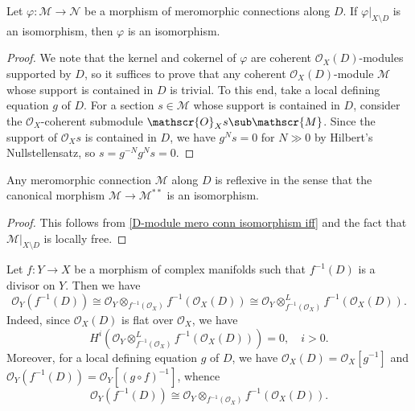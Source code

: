 \begin{proposition}\label{D-module mero conn isomorphism iff}
Let $\varphi:\mathscr{M}\to\mathscr{N}$ be a morphism of meromorphic connections along $D$. If $\varphi|_{X\setminus D}$ is an isomorphism, then $\varphi$ is an isomorphism.
\end{proposition}
\begin{proof}
We note that the kernel and cokernel of $\varphi$ are coherent $\mathscr{O}_X(D)$-modules supported by $D$, so it suffices to prove that any coherent $\mathscr{O}_X(D)$-module $\mathscr{M}$ whose support is contained in $D$ is trivial. To this end, take a local defining equation $g$ of $D$. For a section $s\in\mathscr{M}$ whose support is contained in $D$, consider the $\mathscr{O}_X$-coherent submodule $\mathscr{O}_Xs\sub\mathscr{M}$. Since the support of $\mathscr{O}_Xs$ is contained in $D$, we have $g^Ns=0$ for $N\gg 0$ by Hilbert's Nullstellensatz, so $s=g^{-N}g^Ns=0$.
\end{proof}

\begin{corollary}\label{D-module mero conn reflexive}
Any meromorphic connection $\mathscr{M}$ along $D$ is reflexive in the sense that the canonical morphism $\mathscr{M}\to\mathscr{M}^{**}$ is an isomorphism.
\end{corollary}
\begin{proof}
This follows from \cref{D-module mero conn isomorphism iff} and the fact that $\mathscr{M}|_{X\setminus D}$ is locally free.
\end{proof}
Let $f:Y\to X$ be a morphism of complex manifolds such that $f^{-1}(D)$ is a divisor on $Y$. Then we have
\[\mathscr{O}_Y(f^{-1}(D))\cong\mathscr{O}_Y\otimes_{f^{-1}(\mathscr{O}_X)}f^{-1}(\mathscr{O}_X(D))\cong\mathscr{O}_Y\otimes_{f^{-1}(\mathscr{O}_X)}^Lf^{-1}(\mathscr{O}_X(D)).\]
Indeed, since $\mathscr{O}_X(D)$ is flat over $\mathscr{O}_X$, we have
\[H^i(\mathscr{O}_Y\otimes_{f^{-1}(\mathscr{O}_X)}^Lf^{-1}(\mathscr{O}_X(D)))=0,\quad i>0.\]
Moreover, for a local defining equation $g$ of $D$, we have $\mathscr{O}_X(D)=\mathscr{O}_X[g^{-1}]$ and $\mathscr{O}_Y(f^{-1}(D))=\mathscr{O}_Y[(g\circ f)^{-1}]$, whence
\[\mathscr{O}_Y(f^{-1}(D))\cong\mathscr{O}_Y\otimes_{f^{-1}(\mathscr{O}_X)}f^{-1}(\mathscr{O}_X(D)).\]


